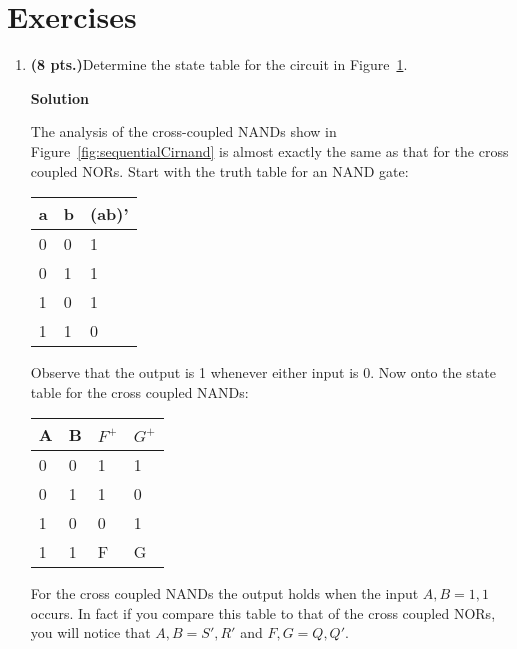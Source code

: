 \section{Exercises}
\label{section:sequentialCircuitsExercises}
\graphicspath{ {./chapter05/FigHw} }

\begin{enumerate}

    \item \textbf{ (8 pts.)}Determine the state table for the circuit in Figure~\ref{fig:sequentialCirNANDs}.
        \begin{figure}[ht]
            \caption{}
            \label{fig:sequentialCirNANDs}
        \end{figure}

        \begin{onlysolution}  \textbf{Solution} \itshape{
                The analysis of the cross-coupled NANDs show in Figure~\ref{fig:sequentialCirnand} is
                almost exactly the same as that for the cross coupled NORs.  Start with
                the truth table for an NAND gate:

                \begin{tabular}{l|l||l}
                    a & b & (ab)' \\ \hline
                    0 & 0 & 1 \\ \hline
                    0 & 1 & 1 \\ \hline
                    1 & 0 & 1 \\ \hline
                    1 & 1 & 0 \\
                \end{tabular}

                Observe that the output is 1 whenever
                either input is 0.  Now onto the state table for the cross coupled NANDs:

                \begin{tabular}{l|l||l|l}
                    A & B & $F^+$ & $G^+$ \\ \hline
                    0 & 0 & 1 & 1 \\ \hline
                    0 & 1 & 1 & 0 \\ \hline
                    1 & 0 & 0 & 1 \\ \hline
                    1 & 1 & F & G \\
                \end{tabular}

                For the cross coupled NANDs the output holds when the input $A,B=1,1$ occurs.
                In fact if you compare this table to that of the cross coupled NORs, you will
                notice that $A,B = S',R'$ and $F,G = Q,Q'$.
            }
        \end{onlysolution}


\end{enumerate}
